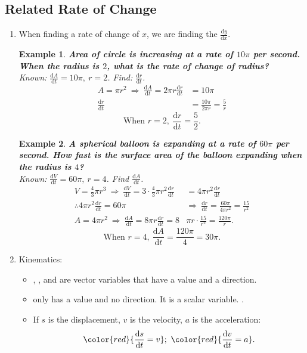 \documentclass[12pt, a4paper]{article}
\newtheorem{example}{Example}[subsection]
\begin{document}
\subsection{Related Rate of Change}
\begin{enumerate}
    \item When finding a rate of change of $x$, we are finding the $\frac{\mathrm{d}y}{\mathrm{d}x}$.
    \begin{example}
        \textbf{Area of circle is increasing at a rate of $10\pi$ per second. When the radius is $2$, what is the rate of change of radius? }\\
        Known: $\frac{\mathrm{d}A}{\mathrm{d}t}=10\pi,\ r=2$. Find: $\frac{\mathrm{d}r}{\mathrm{d}t}$.
        $$\begin{aligned}
            A=\pi r^2 \ \Rightarrow \ \frac{\mathrm{d}A}{\mathrm{d}t}=2\pi r\frac{\mathrm{d}r}{\mathrm{d}t}&=10\pi\\
            \frac{\mathrm{d}r}{\mathrm{d}t}&=\frac{10\pi}{2\pi r}=\frac{5}{r}
        \end{aligned}$$
        $$\text{When }r=2,\ \frac{\mathrm{d}r}{\mathrm{d}t}=\frac{5}{2}.$$
    \end{example}
    \begin{example}
        \textbf{A spherical balloon is expanding at a rate of $60\pi$ per second. How fast is the surface area of the balloon expanding when the radius is $4$? }\\
        Known: $\frac{\mathrm{d}V}{\mathrm{d}t}=60\pi,\ r=4$. Find $\frac{\mathrm{d}A}{\mathrm{d}t}$.
        $$\begin{aligned}
            V=\frac{4}{3}\pi r^3\ \Rightarrow\ \frac{\mathrm{d}V}{\mathrm{d}t}=3\cdot\frac{4}{3}\pi r^2\frac{\mathrm{d}r}{\mathrm{d}t}&=4\pi r^2\frac{\mathrm{d}r}{\mathrm{d}t}\\
            \therefore 4\pi r^2\frac{\mathrm{d}r}{\mathrm{d}t}=60\pi\ &\Rightarrow\ \frac{\mathrm{d}r}{\mathrm{d}t}=\frac{60\pi}{4\pi r^2}=\frac{15}{r^2}\\
            A=4\pi r^2\ \Rightarrow\ \frac{\mathrm{d}A}{\mathrm{d}t}=8\pi r\frac{\mathrm{d}r}{\mathrm{d}t}=8&\pi r\cdot\frac{15}{r^2}=\frac{120\pi}{r}.
        \end{aligned}$$
        $$\text{When }r=4,\ \frac{\mathrm{d}A}{\mathrm{d}t}=\frac{120\pi}{4}=30\pi.$$
    \end{example}
    \item Kinematics: 
    \begin{itemize}
        \item {\color{red}{Velocity}}, {\color{red}{displacement}}, and {\color{red}{acceleration}} are vector variables that have a value and a direction. 
        \item {\color{red}{Speed}} only has a value and no direction. It is a scalar variable. {\color{green}{No sign should be reported in the answer}}.
        \item If $s$ is the displacement, $v$ is the velocity, $a$ is the acceleration: $${\color{red}{\frac{\mathrm{d}s}{\mathrm{d}t}=v}};\ {\color{red}{\frac{\mathrm{d}v}{\mathrm{d}t}=a}}.$$
    \end{itemize}
\end{enumerate}
\end{document}
